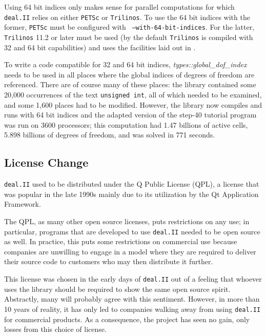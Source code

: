 \documentclass{siamltex}
\newcommand{\specialword}[1]{\texttt{#1}}
\newcommand{\dealii}{{\specialword{deal.II}}}
\newcommand{\trilinos}{{\specialword{Trilinos}}}
\newcommand{\petsc}{\specialword{PETSc}}
\begin{document}
Using 64 bit indices only makes sense for parallel computations for which
\dealii{} relies on either \petsc{} or \trilinos{}.  To use the 64 bit indices
with the former, \petsc{} must be configured with {\tt
  --with-64-bit-indices}. For the latter, \trilinos{} 11.2 or later must be
used (by the default \trilinos{} is compiled with 32 and 64 bit capabilities) and
uses the facilities laid out in \cite{trilinos64}. 

To write a code compatible for 32 and 64 bit indices,
\emph{types::global\_dof\_index} needs to be used in all places where the
global indices of degrees of freedom are referenced. There are of course many
of these places: the library contained some 20,000 occurrences of the text
\texttt{unsigned int}, all of which needed to be examined, and some 1,600
places had to be modified. However, the library now compiles and runs with 64
bit indices and the adapted version of the step-40 tutorial program was run on
3600 processors; this computation had 1.47 billions of active cells, 5.898
billions of degrees of freedom, and was solved in 771 seconds.




\subsection{License Change}\label{sec:license}

\dealii{} used to be distributed under the Q Public License (QPL), a
license that was popular in the late 1990s mainly due to its utilization by
the Qt Application Framework.

The QPL, as many other open source licenses, puts restrictions on any use;
in particular, programs that are developed to use \dealii{} needed to be
open source as well. In practice, this puts some restrictions on commercial
use because companies are unwilling to engage in a model where they are
required to deliver their source code to customers who may then distribute
it further.

This license was chosen in the early days of \dealii{} out of a feeling that
whoever uses the library should be required to show the same open source
spirit. Abstractly, many will probably agree with this sentiment. However, in
more than 10 years of reality, it has only led to companies walking away from
using \dealii{} for commercial products. As a consequence, the project has
seen no gain, only losses from this choice of license. 
\end{document}
